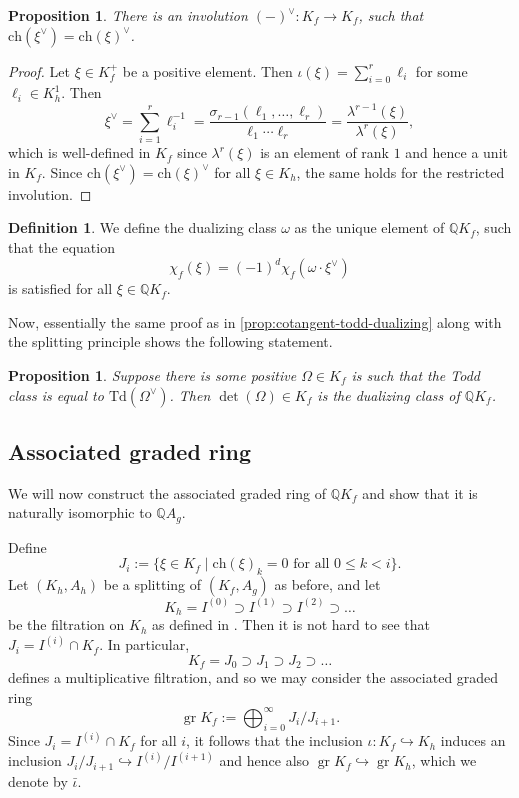 \documentclass[oneside]{amsart}
\theoremstyle{plain}
\newtheorem{proposition}[theorem]{Proposition}
\theoremstyle{definition}
\newtheorem{definition}[theorem]{Definition}
\newcommand{\Q}{{\mathbb{Q}}}
\newcommand{\gr}{\operatorname{gr}}
\newcommand{\ch}{{\mathrm{ch}}}
\newcommand{\Td}{{\mathrm{Td}}}
\begin{document}
\begin{proposition}
    There is an involution $(-)^\vee: K_f \to K_f$, such that $\ch(\xi^\vee) = \ch(\xi)^\vee$.
\end{proposition}

\begin{proof}
    Let $\xi \in K_f^+$ be a positive element. Then $\iota(\xi) = \sum_{i = 0}^r \ell_i$ for some $\ell_i \in K_h^1$.
    Then
    \[
        \xi^\vee = \sum_{i = 1}^r \ell_i^{-1}
        = \frac{\sigma_{r - 1}(\ell_1, \dots, \ell_r)}{\ell_1 \cdots \ell_r}
        = \frac{\lambda^{r - 1}(\xi)}{\lambda^r(\xi)},
    \]
    which is well-defined in $K_f$ since $\lambda^r(\xi)$ is an element of rank $1$ and hence a unit in $K_f$.
    Since $\ch(\xi^\vee) = \ch(\xi)^\vee$ for all $\xi \in K_h$, the same holds for the restricted involution.
\end{proof}

\begin{definition}
We define the dualizing class $\omega$ as the unique element of $\Q K_f$, such that the equation 
\[
    \chi_f(\xi) = (-1)^d \chi_f(\omega \cdot \xi^\vee)
\]
is satisfied for all $\xi \in \Q K_f$.
\end{definition}

Now, essentially the same proof
as in \ref{prop:cotangent-todd-dualizing} along with the splitting principle shows the
following statement.

\begin{proposition}\label{prop:canonical-equals-cotangent-determinant-general}
Suppose there is some positive $\Omega \in K_f$ is such that
the Todd class is equal to $\Td(\Omega^\vee)$. Then
$\det(\Omega) \in K_f$ is the dualizing class of $\Q K_f$.
\end{proposition}

\subsection{Associated graded ring}

We will now construct the associated graded ring of $\Q K_f$ and show that it is naturally isomorphic to $\Q A_g$.

Define
\[J_i :=  \{ \xi \in K_f \mid \ch(\xi)_k = 0 \textrm{ for all $0 \leq k < i$} \}.\]
Let $(K_h, A_h)$ be a splitting of $(K_f, A_g)$ as before, and let 
\[K_h = I^{(0)} \supset I^{(1)} \supset I^{(2)} \supset \dots\]
be the filtration on $K_h$ as defined in .
Then it is not hard to see that $J_i = I^{(i)} \cap K_f$. In particular, 
\[K_f = J_0 \supset J_1 \supset J_2 \supset \dots\]
defines a multiplicative filtration, 
and so we may consider the associated graded ring
\[
    \gr K_f := \bigoplus_{i = 0}^\infty J_{i}/J_{i + 1}.
\]
Since $J_i = I^{(i)} \cap K_f$ for all $i$, it follows that the inclusion $\iota: K_f \hookrightarrow K_{h}$ induces an inclusion $J_i/J_{i + 1} \hookrightarrow I^{(i)}/I^{(i+1)}$ and hence also 
$\gr K_f \hookrightarrow \gr K_{h}$, which we denote by $\bar\iota$.
\end{document}
